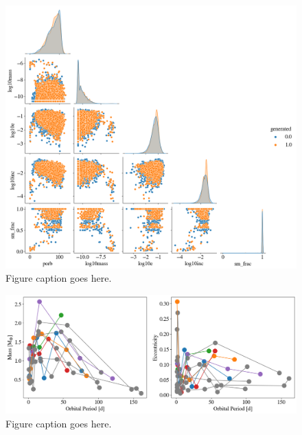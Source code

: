 \begin{figure}
\begin{center}
    \includegraphics[width=\textwidth]{figures/stip/real_syn_corner.png}
    \caption{Figure caption goes here.\label{fig:real_syn_corner}}
\end{center}
\end{figure}

\begin{figure}
\begin{center}
    \includegraphics[width=\textwidth]{figures/stip/per_mass_ecc_syn_comp.png}
    \caption{Figure caption goes here.\label{fig:per_mass_ecc_syn_comp}}
\end{center}
\end{figure}

